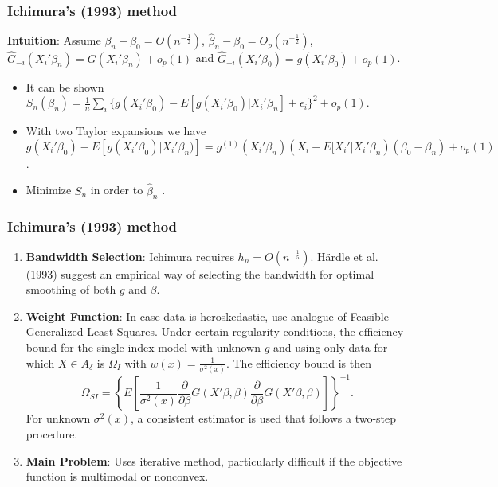 \documentclass[11pt]{beamer}
\begin{document}
\begin{frame}[t]
    \frametitle{Ichimura's (1993) method}

\textbf{Intuition}: Assume $\beta_n - \beta_0 = O(n^{-\frac{1}{2}})$, $\hat{\beta}_n - \beta_0 = O_p(n^{-\frac{1}{2}})$, $ \hat{G}_{-i}(X_i'\beta_n) = G(X_i'\beta_n) + o_p(1)$ and $\hat{G}_{-i}(X_i'\beta_0) = g(X_i'\beta_0) + o_p(1)$. 
\begin{itemize}

	\item It can be shown $ S_{n}(\beta_n) = \frac{1}{n}\sum_i \{ g(X_i'\beta_0) - E[g(X_i'\beta_0)|X_i'\beta_n] +  \epsilon_i\}^2 + o_p(1)$.
	
	\item With two Taylor expansions we have $g(X_i'\beta_0) - E[g(X_i'\beta_0)|X_i'\beta_n)] = g^{(1)}(X_i'\beta_n)( X_i - E[X_i'|X_i'\beta_n)(\beta_0 - \beta_n) + o_p(1)$.
	
	\item Minimize $S_n$ in order to $\hat{\beta}_n$ .

\end{itemize}

\end{frame}

\begin{frame}[t]
    \frametitle{Ichimura's (1993) method}
  
	\begin{enumerate}

		\item \textbf{Bandwidth Selection}:
Ichimura requires $h_n=O(n^{-\frac{1}{5}})$. H{\"a}rdle et al. (1993) suggest an empirical way of selecting the bandwidth for optimal smoothing of both $g$ and $\beta$.
		\item \textbf{Weight Function}:
	In case data is heroskedastic, use analogue of Feasible Generalized Least Squares. Under certain regularity conditions, the efficiency bound for the single index model with unknown $g$ and using only data for which $X \in A_{\delta}$ is $\Omega_I$ with $w(x) = \frac{1}{\sigma^2(x)}$. The efficiency bound is then
		\begin{equation}
\Omega_{SI} = \left\{ E\left[\frac{1}{\sigma^2(x)}\frac{\partial}{\partial \beta}
 G(X'\beta,\beta)\frac{\partial}{\partial \beta} G(X'\beta,\beta) \right] \right\}^{-1}.
		\end{equation}
For unknown $\sigma^2(x)$, a consistent estimator is used that follows a two-step procedure.
		\item \textbf{Main Problem}: Uses iterative method, particularly difficult if the objective function is multimodal or nonconvex.

	\end{enumerate}

\end{frame}
\end{document}
